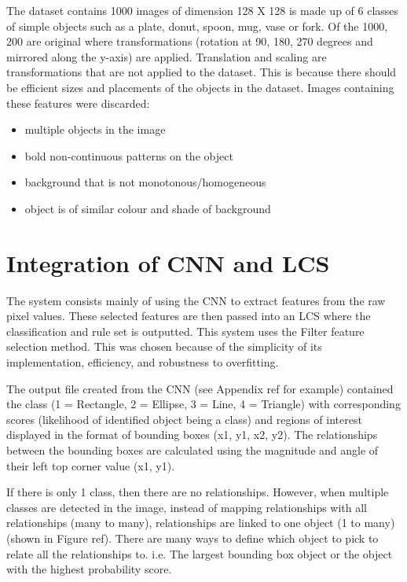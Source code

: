 The dataset contains 1000 images of dimension  128 X 128 is made up of 6 classes of simple objects such as a plate, donut, spoon, mug, vase or fork. Of the 1000, 200 are original where transformations (rotation at 90, 180, 270 degrees and mirrored along the y-axis) are applied. Translation and scaling are transformations that are not applied to the dataset. This is because there should be efficient sizes and placements of the objects in the dataset. Images containing these features were discarded:

\begin{itemize}
	\item multiple objects in the image
	\item bold non-continuous patterns on the object
	\item background that is not monotonous/homogeneous
	\item object is of similar colour and shade of background
\end{itemize}

\section{Integration of CNN and LCS}
The system consists mainly of using the CNN to extract features from the raw pixel values. These selected features are then passed into an LCS where the classification and rule set is outputted. This system uses the Filter feature selection method. This was chosen because of the simplicity of its implementation, efficiency, and robustness to overfitting. 

The output file created from the CNN (see Appendix ref for example) contained the class (1 = Rectangle, 2 = Ellipse, 3 = Line, 4 = Triangle) with corresponding scores (likelihood of identified object being a class) and regions of interest displayed in the format of bounding boxes (x1, y1, x2, y2). The relationships between the bounding boxes are calculated using the magnitude and angle of their left top corner value (x1, y1). 

If there is only 1 class, then there are no relationships. However, when multiple classes are detected in the image, instead of mapping relationships with all relationships (many to many), relationships are linked to one object (1 to many) (shown in Figure ref). There are many ways to define which object to pick to relate all the relationships to. i.e. The largest bounding box object or the object with the highest probability score. 


